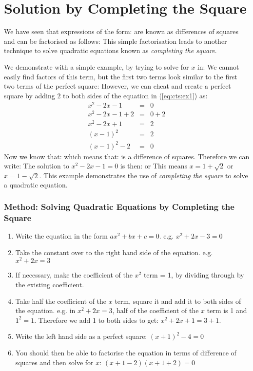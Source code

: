 \section{Solution by Completing the Square}

We have seen that expressions of the form:
are known as differences of squares and can be factorised as follows:
This simple factorisation leads to another technique to solve quadratic equations known as \textit{completing the square}.

We demonstrate with a simple example, by trying to solve for $x$ in:
We cannot easily find factors of this term, but the first two terms look similar to the first two terms of the perfect square:
However, we can cheat and create a perfect square by adding 2 to both sides of the equation in (\ref{eq:cts:ex1}) as:
\begin{eqnarray*}
x^2-2x-1&=&0\\
x^2-2x-1+2&=&0+2\\
x^2-2x+1&=&2\\
(x-1)^2&=&2\\
(x-1)^2-2&=&0
\end{eqnarray*}
Now we know that:
which means that:
is a difference of squares.
Therefore we can write:
The solution to $x^2-2x-1=0$ is then:
or
This means $x=1+\sqrt{2}$ or $x=1-\sqrt{2}$. This example demonstrates the use of \textit{completing the square} to solve a quadratic equation.

\subsubsection{Method: Solving Quadratic Equations by Completing the Square}
\begin{enumerate}
\item{Write the equation in the form $ax^2+bx+c=0$. e.g. $x^2+2x-3=0$}
\item{Take the constant over to the right hand side of the equation. e.g. $x^2+2x=3$}
\item{If necessary, make the coefficient of the $x^2$ term = 1, by dividing through by the existing coefficient.}
\item{Take half the coefficient of the $x$ term, square it and add it to both sides of the equation. e.g. in $x^2+2x=3$, half of the coefficient of the $x$ term is 1 and $1^2=1$. Therefore we add 1 to both sides to get: $x^2+2x+1=3+1$.}
\item{Write the left hand side as a perfect square: $(x+1)^2-4=0$}
\item{You should then be able to factorise the equation in terms of difference of squares and then solve for $x$: $(x+1-2)(x+1+2)=0$}
\end{enumerate}

